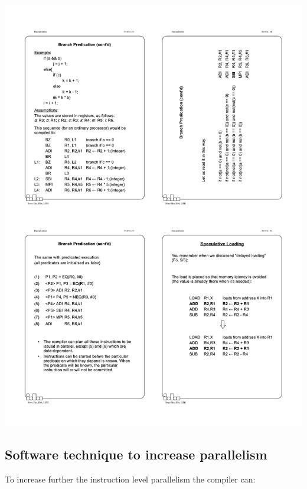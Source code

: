 \begin{center}
  \includegraphics[width=1.1\linewidth]{img/img3/predication2}
\end{center}

\subsection{Software technique to increase parallelism}
To increase further the instruction level parallelism the compiler can:

